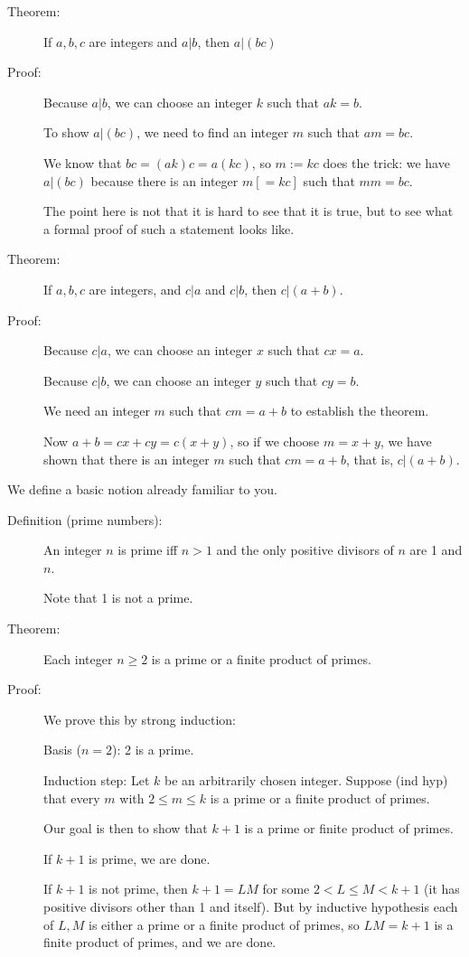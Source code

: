 \documentclass[12pt]{article}
\begin{document}
\begin{description}

\item[Theorem:]  If $a,b,c$ are integers and $a|b$, then $a|(bc)$

\item[Proof:]  Because $a|b$, we can choose an integer $k$ such that $ak = b$.

To show $a|(bc)$, we need to find an integer $m$ such that $am = bc$.

We know that $bc= (ak)c = a(kc)$, so $m := kc$ does the trick:  we have $a|(bc)$ because there is an integer $m [=kc]$ such that $mm=bc$.

The point here is not that it is hard to see that it is true, but to see what a formal proof of such a statement looks like.


\item[Theorem:]  If $a,b,c$ are integers, and $c|a$ and $c|b$, then $c|(a+b)$.

\item[Proof:]  Because $c|a$, we can choose an integer $x$ such that $cx=a$.

Because $c|b$, we can choose an integer $y$ such that $cy=b$.

We need an integer $m$ such that $cm=a+b$ to establish the theorem.

Now $a+b=cx+cy=c(x+y)$, so if we choose $m=x+y$, we have shown that there is an integer $m$ such that $cm=a+b$, that is, $c|(a+b)$.

\end{description}

We define a basic notion already familiar to you.

\begin{description}

\item[Definition (prime numbers):]  An integer $n$ is prime iff $n>1$ and the only positive divisors of $n$ are 1 and $n$.

Note that 1 is not a prime.

\item[Theorem:]  Each integer $n\geq 2$ is a prime or a finite product of primes.

\item[Proof:]  We prove this by strong induction:

Basis ($n=2$):  2 is a prime.

Induction step:  Let $k$ be an arbitrarily chosen integer.  Suppose (ind hyp) that every $m$ with $2 \leq m \leq k$ is
a prime or a finite product of primes.

Our goal is then to show that $k+1$ is a prime or finite product of primes.

If $k+1$ is prime, we are done.

If $k+1$ is not prime, then $k+1 = LM$ for some $2 < L \leq M < k+1$ (it has positive divisors other than 1 and itself).
But by inductive hypothesis each of $L,M$ is either a prime or a finite product of primes, so $LM=k+1$ is a finite product of primes, and we are done.

\end{description}
\end{document}
